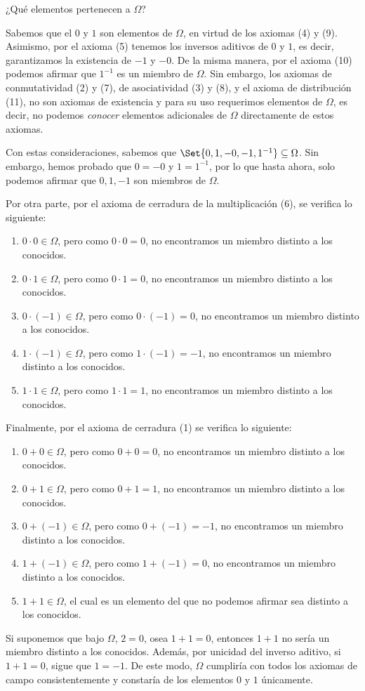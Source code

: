 \documentclass[11pt]{article}
\let\set\Set
\let\subset\subseteq
\begin{document}
¿Qué elementos pertenecen a $\Omega$?

Sabemos que el $0$ y $1$ son elementos de $\Omega$, en virtud de los axiomas (4) y (9). Asimismo, por el axioma (5) tenemos los inversos aditivos de $0$ y $1$, es decir, garantizamos la existencia de $-1$ y $-0$. De la misma manera, por el axioma (10) podemos afirmar que $1^{-1}$ es un miembro de $\Omega$. Sin embargo, los axiomas de conmutatividad (2) y (7), de asociatividad (3) y (8), y el axioma de distribución (11), no son axiomas de existencia y para su uso requerimos elementos de $\Omega$, es decir, no podemos \textit{conocer} elementos adicionales de $\Omega$ directamente de estos axiomas.

Con estas consideraciones, sabemos que $\set{0,1,-0,-1,1^{-1}}\subset \Omega$. Sin embargo, hemos probado que $0=-0$ y $1=1^{-1}$, por lo que hasta ahora, solo podemos afirmar que $0,1,-1$ son miembros de $\Omega$.

Por otra parte, por el axioma de cerradura de la multiplicación (6), se verifica lo siguiente:

\begin{enumerate}[label=\roman*)]
    \item $0\cdot 0\in \Omega$, pero como $0\cdot 0=0$, no encontramos un miembro distinto a los conocidos.
    \item $0 \cdot 1 \in \Omega$, pero como $0\cdot 1=0$, no encontramos un miembro distinto a los conocidos. 
    \item $0 \cdot (-1) \in \Omega$, pero como $0\cdot (-1)=0$, no encontramos un miembro distinto a los conocidos.
    \item $1\cdot (-1) \in \Omega$, pero como $1\cdot (-1)=-1$, no encontramos un miembro distinto a los conocidos.
    \item $1\cdot 1\in \Omega$, pero como $1\cdot 1=1$, no encontramos un miembro distinto a los conocidos.
\end{enumerate}
Finalmente, por el axioma de cerradura (1) se verifica lo siguiente:
\begin{enumerate}[label=\roman*)]
    \item $0+0 \in \Omega$, pero como $0+0=0$, no encontramos un miembro distinto a los conocidos.
    \item $0+1 \in \Omega$, pero como $0+1=1$, no encontramos un miembro distinto a los conocidos.
    \item $0+(-1) \in \Omega$, pero como $0+(-1)=-1$, no encontramos un miembro distinto a los conocidos.
    \item $1+(-1)\in \Omega$, pero como $1+(-1)=0$, no encontramos un miembro distinto a los conocidos.
    \item$1+1\in \Omega$, el cual es un elemento del que no podemos afirmar sea distinto a los conocidos.
\end{enumerate}
Si suponemos que bajo $\Omega$, $2=0$, osea $1+1=0$, entonces $1+1$ no sería un miembro distinto a los conocidos. Además, por unicidad del inverso aditivo, si $1+1=0$, sigue que $1=-1$. De este modo, $\Omega$ cumpliría con todos los axiomas de campo consistentemente y constaría de los elementos $0$ y $1$ únicamente.
\end{document}
